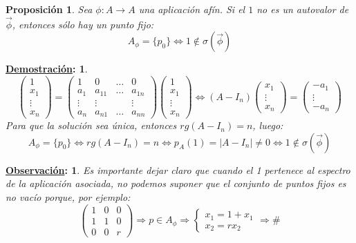 \documentclass[10pt,a4paper,openright]{book}
\theoremstyle{break}
\newtheorem*{prop}{Proposición}
\newtheorem*{demo}{\underline{Demostración}:}
\newtheorem*{obs}{\underline{Observación}:}
\begin{document}
\begin{prop}
Sea $\phi: A \rightarrow A$ una aplicación afín. Si el $1$ no es un autovalor de $\vec{\phi}$, entonces sólo hay un punto fijo:
$$A_\phi = \{p_0\} \Leftrightarrow 1 \notin \sigma(\vec{\phi})$$
\end{prop}
\begin{demo}
$$\begin{pmatrix}
1 \\ x_1 \\ \vdots \\ x_n
\end{pmatrix} = \left(\begin{array}{c|ccc}
1  & 0 & \ldots & 0 \\
\hline
a_1  & a_{11} & \ldots & a_{1n} \\
\vdots & \vdots &  & \vdots \\
a_n & a_{n1} & \ldots & a_{nn}
\end{array}
\right) \begin{pmatrix}
1 \\ x_1 \\ \vdots \\ x_n
\end{pmatrix} \Leftrightarrow (A - I_n) \begin{pmatrix}
x_1 \\ \vdots \\ x_n
\end{pmatrix} = \begin{pmatrix}
-a_1 \\ \vdots \\ -a_n
\end{pmatrix}$$
Para que la solución sea única, entonces $rg(A-I_n) = n$, luego:
$$A_\phi = \{p_0\} \Leftrightarrow rg(A - I_n) = n \Leftrightarrow p_A (1) = |A - I_n| \neq 0 \Leftrightarrow 1\notin \sigma(\vec{\phi})$$
\end{demo}

\begin{obs}
Es importante dejar claro que cuando el 1 pertenece al espectro de la aplicación asociada, no podemos suponer que el conjunto de puntos fijos es no vacío porque, por ejemplo:
$$\left(\begin{array}{c|cc}
1  & 0 & 0 \\
\hline
1 & 1 &  0 \\
0 & 0 &  r
\end{array}
\right) \Rightarrow p\in A_\phi \Rightarrow \begin{cases} x_1 =1 + x_1  \\ x_2 = rx_2 \end{cases} \Rightarrow \#$$
\end{obs}
\end{document}
